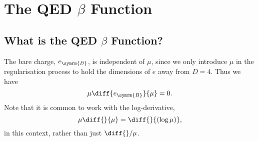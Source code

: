 \documentclass[fleqn]{NotesClass}
\newcommand{\bare}{\symrm{B}}
\begin{document}
    
    \chapter{The QED \texorpdfstring{\(\beta\)}{beta} Function}
    \section{What is the QED \texorpdfstring{\(\beta\)}{beta} Function?}
    The bare charge, \(e_{\bare}\), is independent of \(\mu\), since we only introduce \(\mu\) in the regularisation process to hold the dimensions of \(e\) away from \(D = 4\).
    Thus we have
    \begin{equation}
        \mu \diff{e_{\bare}}{\mu} = 0.
    \end{equation}
    Note that it is common to work with the log-derivative,
    \begin{equation}
        \mu \diff{}{\mu} = \diff{}{(\log \mu)},
    \end{equation}
    in this context, rather than just \(\diff{}/{\mu}\).
    
\end{document}
